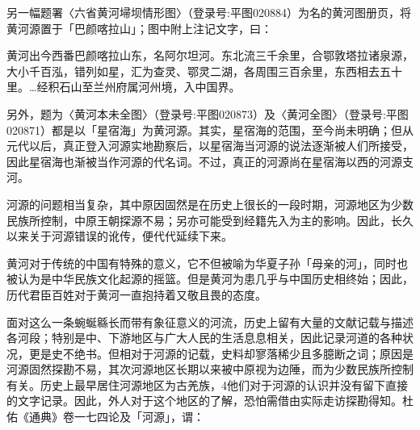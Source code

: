 另一幅题署〈六省黄河埽坝情形图〉（登录号:平图020884）为名的黄河图册页，将黄河源置于「巴颜喀拉山」；图中附上注记文字，曰：

\begin{BookQuote}
黄河出今西番巴颜喀拉山东，名阿尔坦河。东北流三千余里，合鄂敦塔拉诸泉源，大小千百泓，错列如星，汇为查灵、鄂灵二湖，各周围三百余里，东西相去五十里。…经积石山至兰州府属河州境，入中国界。
\end{BookQuote}

另外，题为〈黄河本未全图〉（登录号:平图020873）及〈黄河全图〉（登录号:平图020871）都是以「星宿海」为黄河源。其实，星宿海的范围，至今尚未明确；但从元代以后，真正登入河源实地勘察后，以星宿海当河源的说法逐渐被人们所接受，因此星宿海也渐被当作河源的代名词。不过，真正的河源尚在星宿海以西的河源支河。

河源的问题相当复杂，其中原因固然是在历史上很长的一段时期，河源地区为少数民族所控制，中原王朝探源不易；另亦可能受到经籍先入为主的影响。因此，长久以来关于河源错误的讹传，便代代延续下来。

\vfill
\begin{BookNotes}
\end{BookNotes}







黄河对于传统的中国有特殊的意义，它不但被喻为华夏子孙「母亲的河」，同时也被认为是中华民族文化起源的摇篮。但是黄河为患几乎与中国历史相终始；因此，历代君臣百姓对于黄河一直抱持着又敬且畏的态度。

面对这么一条蜿蜒緜长而带有象征意义的河流，历史上留有大量的文献记载与描述各河段；特别是中、下游地区与广大人民的生活息息相关，因此记录河道的各种状况，更是史不绝书。但相对于河源的记载，史料却寥落稀少且多臆断之词；原因是河源固然探勘不易，其次河源地区长期以来被中原视为边陲，而为少数民族所控制有关。历史上最早居住河源地区为古羌族，4他们对于河源的认识并没有留下直接的文字记录。因此，外人对于这个地区的了解，恐怕需借由实际走访探勘得知。杜佑《通典》卷一七四论及「河源」，谓：

